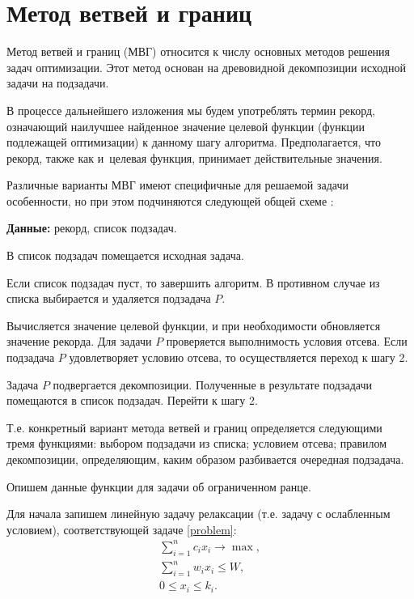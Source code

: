 \documentclass[12pt, a4paper]{article}
\begin{document}
	\section{Метод ветвей и границ}
	
	Метод ветвей и границ (МВГ) относится к числу основных методов решения задач оптимизации. Этот метод основан на древовидной декомпозиции исходной задачи на подзадачи.
	
	В процессе дальнейшего изложения мы будем употреблять термин рекорд, означающий наилучшее найденное значение целевой функции (функции подлежащей оптимизации) к данному шагу алгоритма. Предполагается, что рекорд, также как и~целевая функция, принимает действительные значения.
	
	Различные варианты МВГ имеют специфичные для решаемой задачи особенности, но при этом подчиняются следующей общей схеме \cite{Kolpakov}:
	
	\textbf{Данные:} рекорд, список подзадач.
	
	\begin{STEP}
		\item В список подзадач помещается исходная задача.
		\item Если список подзадач пуст, то завершить алгоритм. В противном случае из списка выбирается и удаляется подзадача $P$.
		\item Вычисляется значение целевой функции, и при необходимости обновляется значение рекорда. Для задачи $P$ проверяется выполнимость условия отсева. Если подзадача $P$ удовлетворяет условию отсева, то осуществляется переход к шагу 2.
		\item Задача $P$ подвергается декомпозиции. Полученные в результате подзадачи помещаются в список подзадач. Перейти к шагу 2.
	\end{STEP}
	
	Т.е. конкретный вариант метода ветвей и границ определяется следующими тремя функциями: выбором подзадачи из списка; условием отсева; правилом декомпозиции, определяющим, каким образом разбивается очередная подзадача.
	
	Опишем данные функции для задачи об ограниченном ранце.
	
	Для начала запишем линейную задачу релаксации (т.е. задачу с ослабленным условием), соответствующей задаче \eqref{problem}:
	\begin{equation}
		\label{relax_problem}
		\begin{gathered}
			\sum_{i=1}^{n} c_i x_i \rightarrow \max, \\
			\sum_{i=1}^{n} w_i x_i \le W, \\
			0 \le x_i \le k_i.
		\end{gathered}
	\end{equation}
	
\end{document}
